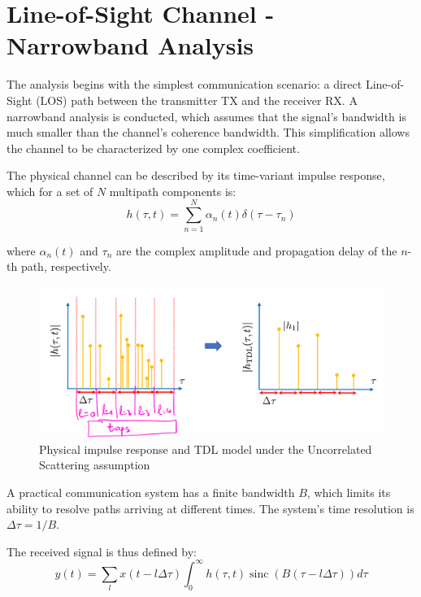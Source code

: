 \chapter{Line-of-Sight Channel - Narrowband Analysis}
\label{chap:los}

The analysis begins with the simplest communication scenario: a direct Line-of-Sight (LOS) path between the transmitter TX and the receiver RX. A narrowband analysis is conducted, which assumes that the signal's bandwidth is much smaller than the channel's coherence bandwidth. This simplification allows the channel to be characterized by one complex coefficient.

The physical channel can be described by its time-variant impulse response, which for a set of $N$ multipath components is:
\begin{equation}
	h(\tau,t) = \sum_{n=1}^{N} \alpha_n(t) \delta(\tau - \tau_n)
\end{equation}

where $\alpha_n(t)$ and $\tau_n$ are the complex amplitude and propagation delay of the $n$-th path, respectively.

\begin{figure}[H]
	\centering
	\includegraphics[width=\linewidth]{content/4-images/taps}
	\caption{Physical impulse response and TDL model under the Uncorrelated Scattering assumption}
	\label{fig:taps}
\end{figure}

A practical communication system has a finite bandwidth $B$, which limits its ability to resolve paths arriving at different times. The system's time resolution is $\Delta\tau = 1/B$. 

The received signal is thus defined by:
\begin{equation}
	y(t) = \sum_l x(t-l \Delta \tau) \int_0^{\infty} h(\tau, t) \operatorname{sinc}(B(\tau-l \Delta \tau)) d \tau
\end{equation}


